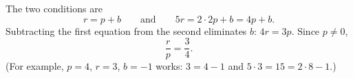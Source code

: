 The two conditions are
\[r=p+b\qquad\text{and}\qquad5r=2\cdot2p+b=4p+b.\]
Subtracting the first equation from the second eliminates $b$: $4r=3p$. Since $p\ne0$,
\[\dfrac rp=\boxed{\dfrac34}.\]
(For example, $p=4$, $r=3$, $b=-1$ works: $3=4-1$ and $5\cdot3=15=2\cdot8-1$.)
